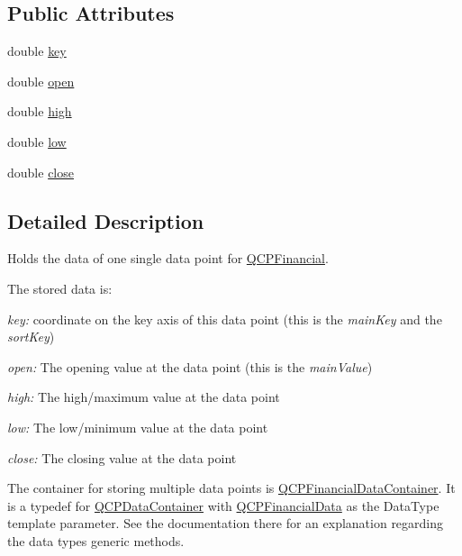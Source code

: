 \subsection*{Public Attributes}
\begin{DoxyCompactItemize}
\item 
double \hyperlink{class_q_c_p_financial_data_a18bc92126f28c214b05b0161e5f5958b}{key}
\item 
double \hyperlink{class_q_c_p_financial_data_a3059e1e1fbcb9fd243fde0450f238032}{open}
\item 
double \hyperlink{class_q_c_p_financial_data_a299a4b241296fb6cd1baf5ab03f7126a}{high}
\item 
double \hyperlink{class_q_c_p_financial_data_aecce0fb45a115e3f3a25eea78491ac16}{low}
\item 
double \hyperlink{class_q_c_p_financial_data_a45e9b96944c4a08ea6c82a72d3d22df2}{close}
\end{DoxyCompactItemize}


\subsection{Detailed Description}
Holds the data of one single data point for \hyperlink{class_q_c_p_financial}{Q\+C\+P\+Financial}. 

The stored data is\+: \begin{DoxyItemize}
\item {\itshape key\+:} coordinate on the key axis of this data point (this is the {\itshape main\+Key} and the {\itshape sort\+Key}) \item {\itshape open\+:} The opening value at the data point (this is the {\itshape main\+Value}) \item {\itshape high\+:} The high/maximum value at the data point \item {\itshape low\+:} The low/minimum value at the data point \item {\itshape close\+:} The closing value at the data point\end{DoxyItemize}
The container for storing multiple data points is \hyperlink{qcustomplot_8h_ae36e482e04f19a54782f01ab38c354a6}{Q\+C\+P\+Financial\+Data\+Container}. It is a typedef for \hyperlink{class_q_c_p_data_container}{Q\+C\+P\+Data\+Container} with \hyperlink{class_q_c_p_financial_data}{Q\+C\+P\+Financial\+Data} as the Data\+Type template parameter. See the documentation there for an explanation regarding the data type\textquotesingle{}s generic methods.


